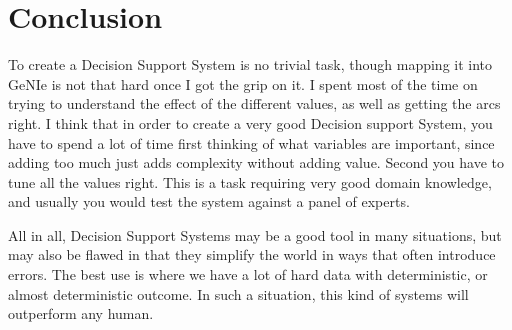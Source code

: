 \section{Conclusion}
To create a Decision Support System is no trivial task, though mapping it into
GeNIe is not that hard once I got the grip on it. I spent most of the time
on trying to understand the effect of the different values, as well as getting
the arcs right. I think that in order to create a very good Decision support
System, you have to spend a lot of time first thinking of what variables are
important, since adding too much just adds complexity without adding value.
Second you have to tune all the values right. This is a task requiring very good
domain knowledge, and usually you would test the system against a panel of
experts.

All in all, Decision Support Systems may be a good tool in many situations, but
may also be flawed in that they simplify the world in ways that often introduce
errors. The best use is where we have a lot of hard data with deterministic, or
almost deterministic outcome. In such a situation, this kind of systems will
outperform any human.

